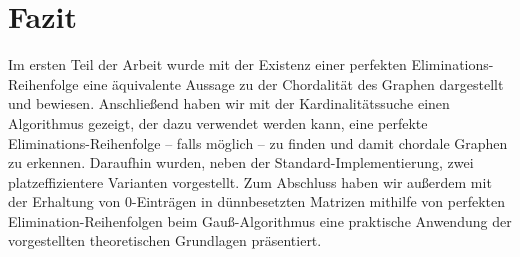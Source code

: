 \section{Fazit}

Im ersten Teil der Arbeit wurde mit der Existenz einer perfekten Eliminations-Reihenfolge eine äquivalente Aussage zu der Chordalität des Graphen dargestellt und bewiesen. Anschließend haben wir mit der Kardinalitätssuche einen Algorithmus gezeigt, der dazu verwendet werden kann, eine perfekte Eliminations-Reihenfolge -- falls möglich -- zu finden und damit chordale Graphen zu erkennen. Daraufhin wurden, neben der Standard-Implementierung, zwei platzeffizientere Varianten vorgestellt. Zum Abschluss haben wir außerdem mit der Erhaltung von \( 0 \)-Einträgen in dünnbesetzten Matrizen mithilfe von perfekten Elimination-Reihenfolgen beim Gauß-Algorithmus eine praktische Anwendung der vorgestellten theoretischen Grundlagen prä\-sen\-tiert.
